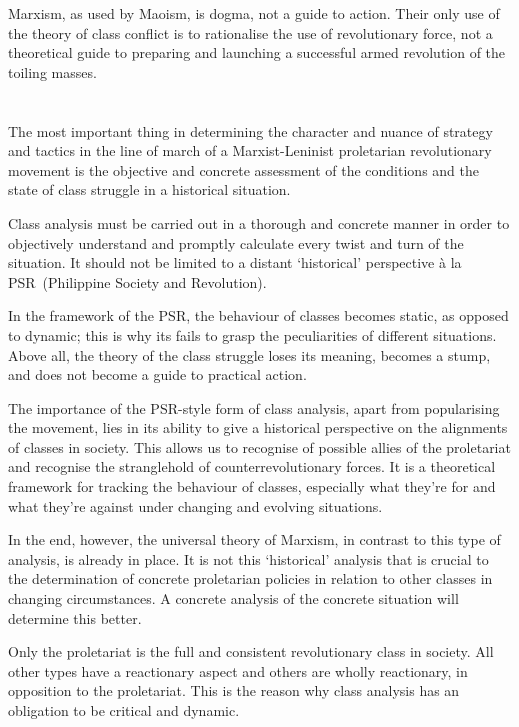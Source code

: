 Marxism, as used by Maoism, is dogma, not a guide to action. 
Their only use of the theory of class conflict is to rationalise 
the use of revolutionary force, 
not a theoretical guide to preparing 
and launching a successful armed revolution of the toiling masses.

\section{}
The most important thing in determining the character and nuance 
of strategy and tactics in the line of march of 
a Marxist-Leninist proletarian revolutionary movement 
is the objective and concrete assessment 
of the conditions and the state of class struggle in a historical situation.

Class analysis must be carried out in 
a thorough and concrete manner in order to 
objectively understand and promptly calculate 
every twist and turn of the situation. 
It should not be limited to a distant `historical' perspective 
à la PSR~(Philippine Society and Revolution).

In the framework of the PSR, 
the behaviour of classes becomes static,
as opposed to dynamic;
this is why its fails to grasp 
the peculiarities of different situations.
Above all, 
the theory of the class struggle 
loses its meaning,
becomes a stump, 
and does not become a guide to practical action.

The importance of the PSR-style form of class analysis, 
apart from popularising the movement, 
lies in its ability to give a 
historical perspective on the alignments of classes in society. 
This allows us to recognise of possible allies of the proletariat 
and recognise the stranglehold of counterrevolutionary forces. 
It is a theoretical framework 
for tracking the behaviour of classes, 
especially what they're for and what they're against 
under changing and evolving situations.

In the end, however, 
the universal theory of Marxism,
in contrast to this type of analysis, 
is already in place. 
It is not this `historical' analysis that is crucial 
to the determination of concrete proletarian policies 
in relation to other classes in changing circumstances. 
A concrete analysis of the concrete situation will determine this better.

Only the proletariat 
is the full and consistent revolutionary class in society. 
All other types have a reactionary aspect 
and others are wholly reactionary,
in opposition to the proletariat. 
This is the reason why class analysis has an obligation
to be critical and dynamic.

